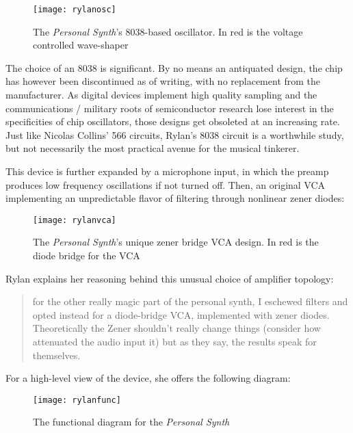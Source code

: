 \begin{figure}[H]
	  \centering
	    \texttt{[image: rylanosc]}
	    \caption{The \textit{Personal Synth}'s 8038-based oscillator\citep{rylan2011}. In red is the voltage controlled wave-shaper}
	\end{figure}
	
The choice of an 8038 is significant. By no means an antiquated design, the chip has however been discontinued as of writing, with no replacement from the manufacturer. As digital devices implement high quality sampling and the communications / military roots of semiconductor research lose interest in the specificities of chip oscillators, those designs get obsoleted at an increasing rate. Just like Nicolas Collins' 566 circuits, Rylan's 8038 circuit is a worthwhile study, but not necessarily the most practical avenue for the musical tinkerer.

This device is further expanded by a microphone input, in which the preamp produces low frequency oscillations if not turned off. Then, an original VCA implementing an unpredictable flavor of filtering through nonlinear zener diodes: 

\begin{figure}[H]
	  \centering
	    \texttt{[image: rylanvca]}
	    \caption{The \textit{Personal Synth}'s unique zener bridge VCA design. In red is the diode bridge for the VCA \citep{rylan2011}}
	\end{figure}
	
Rylan explains her reasoning behind this unusual choice of amplifier topology: 

\begin{quote}
	for the other really magic part of the personal synth, I eschewed filters and opted instead for a diode-bridge VCA, implemented with zener diodes. Theoretically the Zener shouldn't really change things (consider how attenuated the audio input it) but as they say, the results speak for themselves.
\end{quote}

\citep{rylan2011}

For a high-level view of the device, she offers the following diagram: 

\begin{figure}[H]
	  \centering
	    \texttt{[image: rylanfunc]}
	    \caption{The functional diagram for the \textit{Personal Synth} \citep{rylan2011}}
	\end{figure}
	
